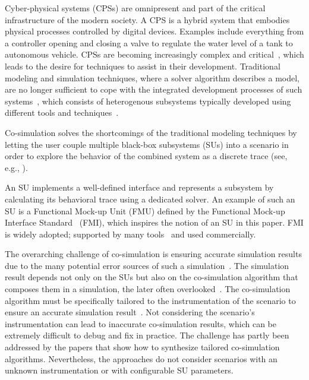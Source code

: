 Cyber-physical systems (CPSs) are omnipresent and part of the critical infrastructure of the modern society.
A CPS is a hybrid system that embodies physical processes controlled by digital devices. Examples include everything from a controller opening and closing a valve to regulate the water level of a tank to autonomous vehicle.
CPSs are becoming increasingly complex and critical~\cite{4519604}, which leads to the desire for techniques to assist in their development.
Traditional modeling and simulation techniques, where a solver algorithm describes a model, are no longer sufficient to cope with the integrated development processes of such systems~\cite{FMI2014}, which consists of heterogenous subsystems typically developed using different tools and techniques~\cite{Monti_2021}. 

Co-simulation solves the shortcomings of the traditional modeling techniques by letting the user couple multiple black-box subsystems (SUs) into a scenario in order to explore the behavior of the combined system as a discrete trace (see, e.g., \cite{Kubler2000,Gomes2018}).

An SU implements a well-defined interface and represents a subsystem by calculating its behavioral trace using a dedicated solver.
An example of such an SU is a Functional Mock-up Unit (FMU) defined by the Functional Mock-up Interface Standard~\cite{FMI2014} (FMI), which inspires the notion of an SU in this paper. 
FMI is widely adopted; supported by many tools~\cite{Tools_FMI} and used commercially.

The overarching challenge of co-simulation is ensuring accurate simulation results due to the many potential error sources of such a simulation~\cite{Gomes2018}.
The simulation result depends not only on the SUs but also on the co-simulation algorithm that composes them in a simulation, the later often overlooked~\cite{Gomes2019,Oakes2021,Gomes2018f,Schweizer2015c}.
The co-simulation algorithm must be specifically tailored to the instrumentation of the scenario to ensure an accurate simulation result~\cite{hansen_verification_2021}.
Not considering the scenario's instrumentation can lead to inaccurate co-simulation results, which can be extremely difficult to debug and fix in practice.
The challenge has partly been addressed by the papers \cite{Gomes2019,Oakes2021,thrane2021} that show how to synthesize tailored co-simulation algorithms.
Nevertheless, the approaches do not consider scenarios with an unknown instrumentation or with configurable SU parameters.

